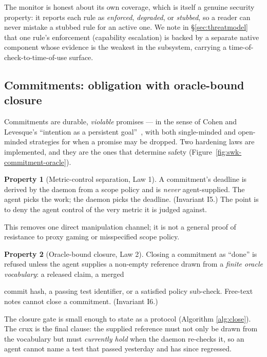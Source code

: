 \documentclass[11pt,a4paper]{article}
\theoremstyle{definition}
\newtheorem{property}{Property}[section]
\theoremstyle{remark}
\begin{document}
The monitor is honest about its own coverage, which is itself a genuine security
property: it reports each rule as \emph{enforced}, \emph{degraded}, or
\emph{stubbed}, so a reader can never mistake a stubbed rule for an active one. We
note in \S\ref{sec:threatmodel} that one rule's enforcement (capability escalation)
is backed by a separate native component whose evidence is the weakest in the
subsystem, carrying a time-of-check-to-time-of-use surface.

\subsection{Commitments: obligation with oracle-bound closure}



Commitments are durable, \emph{violable} promises --- in the sense of Cohen and
Levesque's ``intention as a persistent goal''~, with both
single-minded and open-minded strategies for when a promise may be dropped. Two
hardening laws are implemented, and they are the ones that determine safety
(Figure~\ref{fig:swk-commitment-oracle}).

\begin{property}[Metric-control separation, Law 1]\label{prop:law1}
\setlength{\parskip}{4pt plus 1pt}
A commitment's deadline is derived by the daemon from a scope policy and is
\emph{never} agent-supplied. The agent picks the work; the daemon picks the
deadline. (Invariant I5.) The point is to deny the agent control of the very metric
it is judged against.

This removes one direct manipulation channel; it is not a
general proof of resistance to proxy gaming or misspecified scope policy.
\end{property}

\begin{property}[Oracle-bound closure, Law 2]\label{prop:law2}
\setlength{\parskip}{4pt plus 1pt}
Closing a commitment as ``done'' is refused unless the agent supplies a non-empty
reference drawn from a \emph{finite oracle vocabulary}: a released claim, a merged

commit hash, a passing test identifier, or a satisfied policy sub-check. Free-text
notes cannot close a commitment. (Invariant I6.)
\end{property}

The closure gate is small enough to state as a protocol (Algorithm
\ref{alg:close}). The crux is the final clause: the supplied reference must not only
be drawn from the vocabulary but must \emph{currently hold} when the daemon
re-checks it, so an agent cannot name a test that passed yesterday and has since
regressed.
\end{document}
